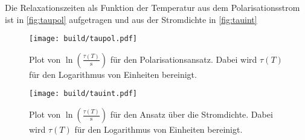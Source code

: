 Die Relaxationszeiten als Funktion der Temperatur aus dem Polarisationsstrom ist in \autoref{fig:taupol} aufgetragen und aus der Stromdichte in \autoref{fig:tauint} 
\begin{figure}[H]
    \centering
    \texttt{[image: build/taupol.pdf]}
    \caption{Plot von $\ln \left(\frac{\tau(T)}{\si{\second}} \right)$ für den Polarisationsansatz. Dabei wird $\tau(T)$ für den Logarithmus von Einheiten bereinigt.}
    \label{fig:taupol}
\end{figure}
\begin{figure}[H]
    \centering
    \texttt{[image: build/tauint.pdf]}
    \caption{Plot von $\ln \left(\frac{\tau(T)}{\si{\second}} \right)$ für den Ansatz über die Stromdichte. Dabei wird $\tau(T)$ für den Logarithmus von Einheiten bereinigt.}
    \label{fig:tauint}
\end{figure}